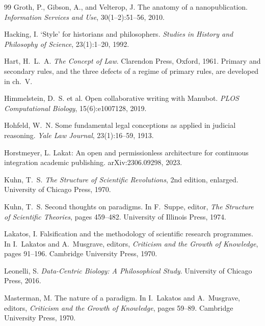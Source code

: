 \documentclass[11pt,letterpaper]{article}
\begin{document}
\begin{thebibliography}{99}
Groth, P., Gibson, A., and Velterop, J.
\newblock The anatomy of a nanopublication.
\newblock \emph{Information Services and Use}, 30(1--2):51--56, 2010.

Hacking, I.
\newblock `Style' for historians and philosophers.
\newblock \emph{Studies in History and Philosophy of Science}, 23(1):1--20,
1992.

Hart, H.~L.~A.
\newblock \emph{The Concept of Law}.
\newblock Clarendon Press, Oxford, 1961.
\newblock Primary and secondary rules, and the three defects of a regime of
primary rules, are developed in ch.~V.

Himmelstein, D.~S. et al.
\newblock Open collaborative writing with Manubot.
\newblock \emph{PLOS Computational Biology}, 15(6):e1007128, 2019.

Hohfeld, W.~N.
\newblock Some fundamental legal conceptions as applied in judicial reasoning.
\newblock \emph{Yale Law Journal}, 23(1):16--59, 1913.

Horstmeyer, L.
\newblock Lakat: An open and permissionless architecture for continuous
integration academic publishing.
\newblock arXiv:2306.09298, 2023.

Kuhn, T.~S.
\newblock \emph{The Structure of Scientific Revolutions}, 2nd edition, enlarged.
\newblock University of Chicago Press, 1970.

Kuhn, T.~S.
\newblock Second thoughts on paradigms.
\newblock In F.~Suppe, editor, \emph{The Structure of Scientific Theories},
pages 459--482. University of Illinois Press, 1974.

Lakatos, I.
\newblock Falsification and the methodology of scientific research programmes.
\newblock In I.~Lakatos and A.~Musgrave, editors, \emph{Criticism and the Growth
of Knowledge}, pages 91--196. Cambridge University Press, 1970.

Leonelli, S.
\newblock \emph{Data-Centric Biology: A Philosophical Study}.
\newblock University of Chicago Press, 2016.

Masterman, M.
\newblock The nature of a paradigm.
\newblock In I.~Lakatos and A.~Musgrave, editors, \emph{Criticism and the Growth
of Knowledge}, pages 59--89. Cambridge University Press, 1970.


\end{thebibliography}
\end{document}
